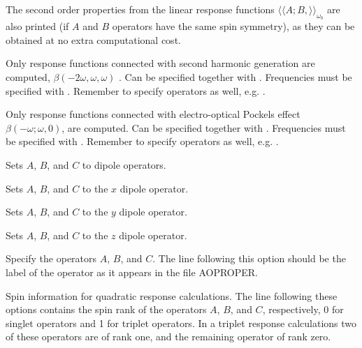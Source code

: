 The second order properties from the linear response functions
$\langle\!\langle A;B,\rangle\!\rangle_{\omega_b}$ are also printed
(if $A$ and $B$ operators have the same spin symmetry),
as they can be obtained at no extra computational cost.

\begin{description}

\item{}
Only response functions connected with second harmonic
generation
are computed, $\beta(-2\omega,\omega,\omega)$ .
Can be specified together with .
Frequencies must be specified with .
Remember to specify operators as well, e.g. .

\item{}
Only response functions connected with electro-optical
Pockels effect
$\beta(-\omega; \omega,0)$, are computed.
Can be specified together with .
Frequencies must be specified with .
Remember to specify operators as well, e.g. .

\item{}
Sets $A$, $B$, and $C$ to dipole operators.

\item{}
Sets $A$, $B$, and $C$ to the $x$ dipole operator.

\item{}
Sets $A$, $B$, and $C$ to the $y$ dipole operator.

\item{}
Sets $A$, $B$, and $C$ to the $z$ dipole operator.

\item[\Key{APROP}, \Key{BPROP}, \Key{CPROP}]
Specify the operators $A$, $B$, and $C$. The line following this
option should be the label of the operator as it appears in the file
AOPROPER.

\item[\Key{ASPIN}, \Key{BSPIN}, \Key{CSPIN}]
Spin information for quadratic response calculations.
The line following these options contains the spin
rank of the operators 
$A$, $B$, and $C$, respectively, 0 for singlet operators and 1 for triplet
operators.
In a triplet response calculations two of these operators are of rank one,
and the remaining operator of rank zero.


\end{description}

